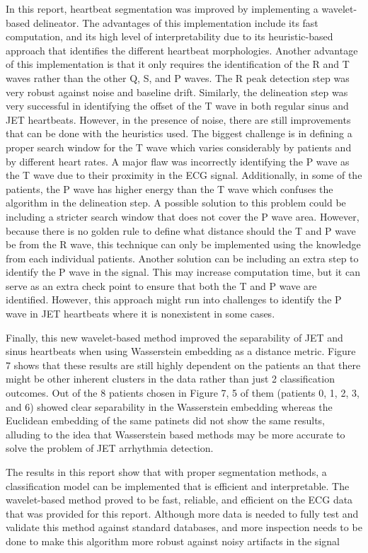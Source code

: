 \documentclass[conference,compsoc]{IEEEtran}
\begin{document}
In this report, heartbeat segmentation was improved by implementing a wavelet-based delineator. The advantages of this implementation include its fast computation, and its high level of interpretability due to its heuristic-based approach that identifies the different heartbeat morphologies. Another advantage of this implementation is that it only requires the identification of the R and T waves rather than the other Q, S, and P waves. The R peak detection step was very robust against noise and baseline drift. Similarly, the delineation step was very successful in identifying the offset of the T wave in both regular sinus and JET heartbeats. However, in the presence of noise, there are still improvements that can be done with the heuristics used. The biggest challenge is in defining a proper search window for the T wave which varies considerably by patients and by different heart rates. A major flaw was incorrectly identifying the P wave as the T wave due to their proximity in the ECG signal. Additionally, in some of the patients, the P wave has higher energy than the T wave which confuses the algorithm in the delineation step. A possible solution to this problem could be including a stricter search window that does not cover the P wave area. However, because there is no golden rule to define what distance should the T and P wave be from the R wave, this technique can only be implemented using the knowledge from each individual patients. Another solution can be including an extra step to identify the P wave in the signal. This may increase computation time, but it can serve as an extra check point to ensure that both the T and P wave are identified. However, this approach might run into challenges to identify the P wave in JET heartbeats where it is nonexistent in some cases.  

Finally, this new wavelet-based method improved the separability of JET and sinus heartbeats when using Wasserstein embedding as a distance metric. Figure 7 shows that these results are still highly dependent on the patients an that there might be other inherent clusters in the data rather than just 2 classification outcomes. Out of the 8 patients chosen in Figure 7, 5 of them (patients 0, 1, 2, 3, and 6) showed clear separability in the Wasserstein embedding whereas the Euclidean embedding of the same patinets did not show the same results, alluding to the idea that Wasserstein based methods may be more accurate to solve the problem of JET arrhythmia detection. 

The results in this report show that with proper segmentation methods, a classification model can be implemented that is efficient and interpretable. The wavelet-based method proved to be fast, reliable, and efficient on the ECG data that was provided for this report. Although more data is needed to fully test and validate this method against standard databases, and more inspection needs to be done to make this algorithm more robust against noisy artifacts in the signal
\end{document}
